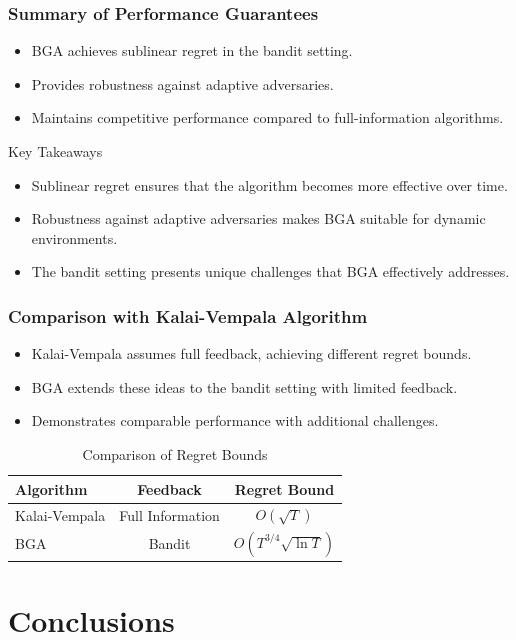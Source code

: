 \documentclass{beamer}
\begin{document}
\begin{frame}
\frametitle{Summary of Performance Guarantees}
\begin{itemize}
    \item BGA achieves sublinear regret in the bandit setting.
    \item Provides robustness against adaptive adversaries.
    \item Maintains competitive performance compared to full-information algorithms.
\end{itemize}
\begin{block}{Key Takeaways}
    \begin{itemize}
        \item Sublinear regret ensures that the algorithm becomes more effective over time.
        \item Robustness against adaptive adversaries makes BGA suitable for dynamic environments.
        \item The bandit setting presents unique challenges that BGA effectively addresses.
    \end{itemize}
\end{block}
\end{frame}

\begin{frame}
\frametitle{Comparison with Kalai-Vempala Algorithm}
\begin{itemize}
    \item Kalai-Vempala assumes full feedback, achieving different regret bounds.
    \item BGA extends these ideas to the bandit setting with limited feedback.
    \item Demonstrates comparable performance with additional challenges.
\end{itemize}
\begin{table}[h]
\centering
\begin{tabular}{|l|c|c|}
\hline
\textbf{Algorithm} & \textbf{Feedback} & \textbf{Regret Bound} \\ \hline
Kalai-Vempala & Full Information & \( O(\sqrt{T}) \) \\ \hline
BGA & Bandit & \( O(T^{3/4} \sqrt{\ln T}) \) \\ \hline
\end{tabular}
\caption{Comparison of Regret Bounds}
\end{table}
\end{frame}

\section{Conclusions}
\end{document}
